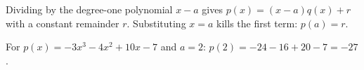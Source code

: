 Dividing by the degree-one polynomial $x-a$ gives $p(x)=(x-a)q(x)+r$ with a constant remainder $r$. Substituting $x=a$ kills the first term: $p(a)=r$.

For $p(x)=-3x^3-4x^2+10x-7$ and $a=2$: $p(2)=-24-16+20-7=\boxed{-27}$.
